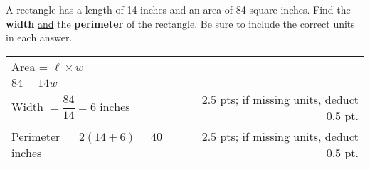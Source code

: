 {
	A rectangle has a length of 14 inches and an area of 84 square inches. Find the {\bf width} \underline{and} the {\bf perimeter} of the rectangle.  Be sure to include the correct units in each answer.
}
{
	\begin{tabular}{l r}
	Area = $\ell \times w $ \\  
	$84=14w$\\
	Width $=\dfrac{84}{14}=6$ inches  & 2.5 pts; if missing units, deduct 0.5 pt. \\ 
	Perimeter $=2(14+6)=40$ inches&2.5 pts; if missing units, deduct 0.5 pt.
	\end{tabular}
}

